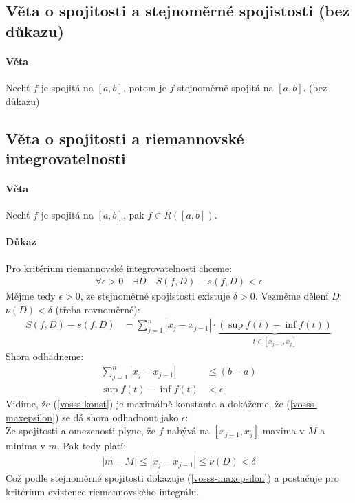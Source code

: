 \documentclass[a4paper,10pt]{article}
\newcommand{\Nu}{\nu}
\begin{document}
\subsection{Věta o spojitosti a stejnoměrné spojistosti (bez důkazu)}
\setcounter{equation}{0}
\paragraph{Věta}
Nechť $f$ je spojitá na $[a,b]$, potom je $f$ stejnoměrně spojitá na $[a,b]$.
(bez důkazu)

\subsection{Věta o spojitosti a riemannovské integrovatelnosti}
\setcounter{equation}{0}
\paragraph{Věta}
Nechť $f$ je spojitá na $[a,b]$, pak $f \in R([a,b])$.
\paragraph{Důkaz}
Pro kritérium riemannovské integrovatelnosti chceme:
\begin{align}
	\forall \epsilon > 0 \quad \exists D \quad S(f,D) - s (f,D) < \epsilon
\end{align}
Mějme tedy $\epsilon > 0$, ze stejnoměrné spojistosti existuje $\delta > 0$.
Vezměme dělení $D$: $\Nu(D) < \delta$ (třeba rovnoměrné):
\begin{align}
	S(f,D) - s(f,D) &= \sum_{j=1}^n |x_j - x_{j-1}| \cdot
		\underbrace{(\sup f(t) - \inf f(t))}_{t \in [x_{j-1},x_j]}
\end{align}
Shora odhadneme:
\begin{align}
	\label{vosss-konst} \sum_{j=1}^n |x_j - x_{j-1}| &\le (b-a) \\
	\label{vosss-maxepsilon} \sup f(t) - \inf f(t) &< \epsilon
\end{align}
Vidíme, že (\ref{vosss-konst}) je maximálně konstanta a dokážeme, že
(\ref{vosss-maxepsilon}) se
dá shora odhadnout jako $\epsilon$:\\
Ze spojitosti a omezenosti plyne, že $f$ nabývá na $[x_{j-1},x_j]$ maxima v $M$ a minima v
$m$. Pak tedy platí:
\begin{align}
	|m-M| \le |x_j - x_{j-1}| \le \Nu (D) < \delta
\end{align}
Což podle stejnoměrné spojitosti dokazuje (\ref{vosss-maxepsilon}) a postačuje pro
kritérium existence riemannovského integrálu.
\end{document}
